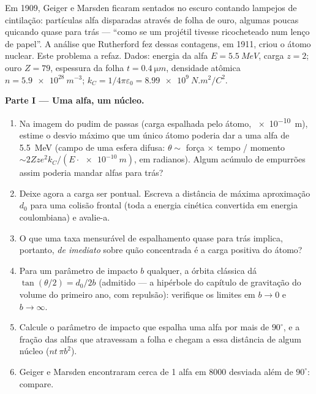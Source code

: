 \begin{problem}\label{pb:b3:scattering-theory:1}
Em 1909, Geiger e Marsden ficaram sentados no escuro contando lampejos
de cintilação: partículas alfa disparadas através de folha de ouro,
algumas poucas quicando quase para trás --- ``como se um projétil
tivesse ricocheteado num lenço de papel''. A análise que Rutherford fez
dessas contagens, em 1911, criou o átomo nuclear. Este problema a
refaz. Dados: energia da alfa $E =
\qty{5.5}{MeV}$, carga $z = 2$;
ouro $Z = 79$, espessura da folha $t
= \qty{0.4}{\micro m}$, densidade atômica $n = \qty{5.9e28}{m^{-3}}$; $k_C =
1/4\pi\varepsilon_0 = \qty{8.99e9}{N.m^2/C^2}$.

\medskip\noindent\textbf{Parte I --- Uma alfa, um núcleo.}
\begin{enumerate}
  \item Na imagem do pudim de passas (carga espalhada pelo átomo,
        \qty{e-10}{m}), estime o desvio máximo que um único átomo
        poderia dar a uma alfa de \qty{5.5}{MeV} (campo de uma esfera
        difusa: $\theta \sim$ força $\times$ tempo / momento
        $\sim 2Zze^2k_C/(E\cdot\qty{e-10}{m})$, em radianos). Algum
        acúmulo de empurrões assim poderia mandar alfas para trás?
  \item Deixe agora a carga ser pontual. Escreva a distância de máxima
        aproximação $d_0$ para uma colisão frontal (toda a energia
        cinética convertida em energia coulombiana) e avalie-a.
  \item O que uma taxa mensurável de espalhamento quase para trás
        implica, portanto, \emph{de imediato} sobre quão concentrada é
        a carga positiva do átomo?
  \item Para um parâmetro de impacto $b$ qualquer, a órbita clássica dá
        $\tan(\theta/2) = d_0/2b$ (admitido --- a hipérbole do capítulo
        de gravitação do volume do primeiro ano, com repulsão):
        verifique os limites em $b \to 0$ e $b \to
        \infty$.
  \item Calcule o parâmetro de impacto que espalha uma alfa por mais de
        $90^\circ$, e a fração das alfas que atravessam a folha e
        chegam a essa distância de algum núcleo ($n t\,\pi
        b^2$).
  \item Geiger e Marsden encontraram cerca de 1 alfa em 8000 desviada
        além de $90^\circ$: compare.
\end{enumerate}


\end{problem}
